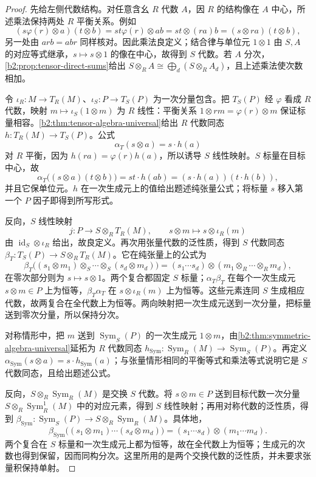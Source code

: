 \begin{proof}
	先给左侧代数结构。对任意含幺 \(R\) 代数 \(A\)，因 \(R\) 的结构像在 \(A\) 中心，所述乘法保持两处 \(R\) 平衡关系。例如
	\[
		(s\varphi(r)\otimes a)(t\otimes b) =st\varphi(r)\otimes ab =st\otimes (ra)b =(s\otimes ra)(t\otimes b),
	\]
	另一处由 \(arb=abr\) 同样核对。因此乘法良定义；结合律与单位元 \(1\otimes1\) 由 \(S,A\) 的对应等式继承，\(s\mapsto s\otimes1\) 的像在中心，故得到 \(S\) 代数。若 \(A\) 分次，\cref{b2:prop:tensor-direct-sums}给出 \(S\otimes_RA\cong\bigoplus_d(S\otimes_RA_d)\)，且上述乘法使次数相加。

	令 \(\iota_R:M\to T_R(M)\)、\(\iota_S:P\to T_S(P)\) 为一次分量包含。把 \(T_S(P)\) 经 \(\varphi\) 看成 \(R\) 代数，映射 \(m\mapsto\iota_S(1\otimes m)\) 为 \(R\) 线性：平衡关系 \(1\otimes rm=\varphi(r)\otimes m\) 保证标量相容。\cref{b2:thm:tensor-algebra-universal}给出 \(R\) 代数同态 \(h:T_R(M)\to T_S(P)\)。公式
	\[
		\alpha_T(s\otimes a)=s\cdot h(a)
	\]
	对 \(R\) 平衡，因为 \(h(ra)=\varphi(r)h(a)\)，所以诱导 \(S\) 线性映射。\(S\) 标量在目标中心，故
	\[
		\alpha_T\bigl((s\otimes a)(t\otimes b)\bigr) =st\cdot h(ab) =(s\cdot h(a))(t\cdot h(b)),
	\]
	并且它保单位元。\(h\) 在一次生成元上的值给出题述纯张量公式；将标量 \(s\) 移入第一个 \(P\) 因子即得到所写形式。

	反向，\(S\) 线性映射
	\[
		j:P\to S\otimes_RT_R(M),\qquad s\otimes m\longmapsto s\otimes\iota_R(m)
	\]
	由 \(\operatorname{id}_S\otimes\iota_R\) 给出，故良定义。再次用张量代数的泛性质，得到 \(S\) 代数同态 \(\beta_T:T_S(P)\to S\otimes_RT_R(M)\)。它在纯张量上的公式为
	\[
		\beta_T\bigl((s_1\otimes m_1)\otimes_S\cdots\otimes_S(s_d\otimes m_d)\bigr) =(s_1\cdots s_d)\otimes(m_1\otimes_R\cdots\otimes_Rm_d),
	\]
	在零次部分则为 \(s\mapsto s\otimes1\)。两个复合都固定 \(S\) 标量；\(\alpha_T\beta_T\) 在每个一次生成元 \(s\otimes m\in P\) 上为恒等，\(\beta_T\alpha_T\) 在 \(s\otimes\iota_R(m)\) 上为恒等。这些元素连同 \(S\) 生成相应代数，故两复合在全代数上为恒等。两向映射把一次生成元送到一次分量，把标量送到零次分量，所以保持分次。

	对称情形中，把 \(m\) 送到 \(\operatorname{Sym}_S(P)\) 的一次生成元 \(1\otimes m\)，由\cref{b2:thm:symmetric-algebra-universal}延拓为 \(R\) 代数同态 \(h_{\mathrm{Sym}}:\operatorname{Sym}_R(M)\to\operatorname{Sym}_S(P)\)。再定义 \(\alpha_{\mathrm{Sym}}(s\otimes a)=s\cdot h_{\mathrm{Sym}}(a)\)；与张量情形相同的平衡等式和乘法等式说明它是 \(S\) 代数同态，且给出题述公式。

	反向，\(S\otimes_R\operatorname{Sym}_R(M)\) 是交换 \(S\) 代数。将 \(s\otimes m\in P\) 送到目标代数一次分量 \(S\otimes_R\operatorname{Sym}_R^1(M)\) 中的对应元素，得到 \(S\) 线性映射；再用对称代数的泛性质，得到 \(\beta_{\mathrm{Sym}}:\operatorname{Sym}_S(P)\to S\otimes_R\operatorname{Sym}_R(M)\)。具体地，
	\[
		\beta_{\mathrm{Sym}}\bigl((s_1\otimes m_1)\cdots(s_d\otimes m_d)\bigr) =(s_1\cdots s_d)\otimes(m_1\cdots m_d).
	\]
	两个复合在 \(S\) 标量和一次生成元上都为恒等，故在全代数上为恒等；生成元的次数也得到保留，因而同构分次。这里所用的是两个交换代数的泛性质，并未要求张量积保持单射。


\end{proof}
